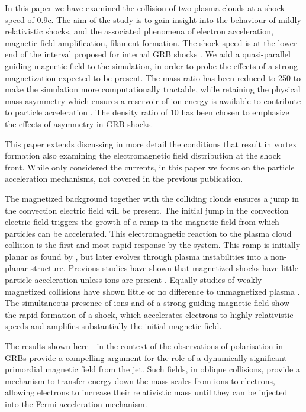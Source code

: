 \documentclass[structabstract]{aa}
\begin{document}
In this paper we have examined the collision of two plasma clouds at a shock speed of 0.9c. The aim of the study 
is to gain insight into the behaviour of mildly relativistic shocks, and the associated phenomena of electron 
acceleration, magnetic field amplification, filament formation. The shock speed is at the lower end of the 
interval proposed for internal GRB shocks \citep{Piran:1999jt}. We add a quasi-parallel guiding magnetic field to 
the simulation, in order to probe the effects of a strong magnetization expected to be present.
The mass ratio has been reduced to 250 to make the simulation more computationally tractable, while retaining the 
physical mass asymmetry which ensures a reservoir of ion energy is available to contribute to particle acceleration \citep{Amato:2006lr}. The density ratio of 10 has been chosen to emphasize the effects of asymmetry in GRB shocks.
{ This paper extends  discussing in more detail the conditions that result in vortex formation also examining the electromagnetic field distribution at the shock front. While   only considered the currents, in this paper we
 focus on the particle acceleration mechanisms, not covered in the previous publication.

}


The magnetized background together with the colliding clouds ensures a jump in the convection electric field will 
be present. The initial jump in the convection electric field triggers the growth of a ramp in the magnetic field 
from which particles can be accelerated. This electromagnetic reaction to the plasma cloud collision is the first 
and most rapid response by the system. This ramp is initially planar as found by \citet{Dieckmann:2010qf}, but 
later evolves through plasma instabilities into a non-planar structure. Previous studies have shown that magnetized 
shocks have little particle acceleration unless ions are present \citep{Hoshino:1992fk,Amato:2006lr}. Equally studies 
of weakly magnetized collisions have shown little or no difference to unmagnetized plasma \citep{Nishikawa:2003eu}. 
The simultaneous presence of ions and of a strong guiding magnetic field show the rapid formation of a shock, which
accelerates electrons to highly relativistic speeds and amplifies substantially the initial magnetic field.

The results shown here - in the context of the observations of polarisation in GRBs \citep{Coburn:2003ul,Steele:2009uq} provide a compelling argument for the role of a dynamically significant primordial magnetic field from the jet. Such fields, in oblique collisions, provide a mechanism to transfer energy down the mass scales from ions to electrons, allowing electrons to increase their relativistic mass until they can be injected into the Fermi acceleration mechanism.
\end{document}

